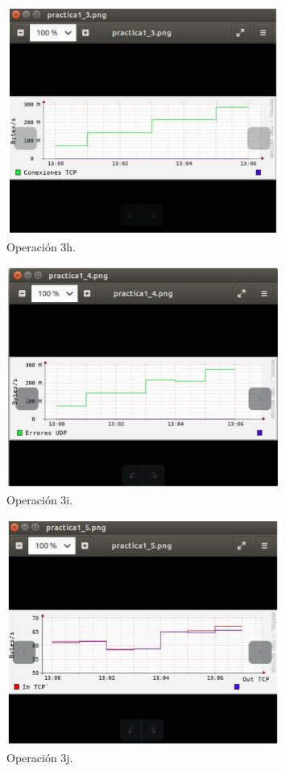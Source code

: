 \begin{figure}[htbp!]
	\centering
		\includegraphics[width=0.8\textwidth]{images/tarea3/op3h}
	\caption{Operación 3h.}
\end{figure}

\begin{figure}[htbp!]
	\centering
		\includegraphics[width=0.8\textwidth]{images/tarea3/op3i}
	\caption{Operación 3i.}
\end{figure}

\begin{figure}[htbp!]
	\centering
		\includegraphics[width=0.8\textwidth]{images/tarea3/op3j}
	\caption{Operación 3j.}
\end{figure}

